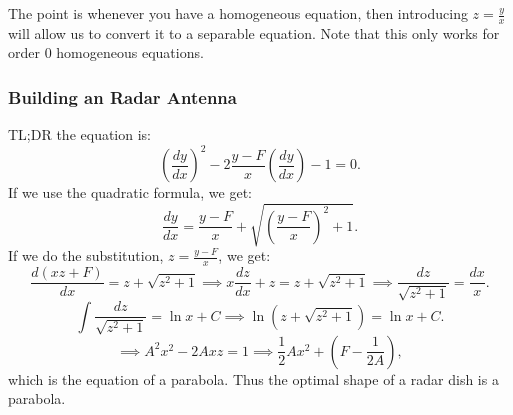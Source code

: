 \documentclass[../main/main.tex]{subfiles}
\begin{document}
\begin{remark}
	The point is whenever you have a homogeneous equation, then introducing $z=\frac{y}{x}$ will allow us to convert it to a separable equation. Note that this only works for order 0 homogeneous equations.
\end{remark}

\subsubsection{Building an Radar Antenna}
TL;DR the equation is: \[
	\left( \frac{dy}{dx} \right) ^2-2 \frac{y-F}{x} \left( \frac{dy}{dx} \right) -1 = 0
.\]  If we use the quadratic formula, we get: \[
\frac{dy}{dx} = \frac{y-F}{x}+\sqrt{\left( \frac{y-F}{x} \right) ^2+1} 
.\] If we do the substitution, $z=\frac{y-F}{x}$, we get: \[
\frac{d(xz+F)}{dx} = z+\sqrt{z^2+1} \implies x \frac{dz}{dx}+z = z + \sqrt{z^2+1}  \implies \frac{dz}{\sqrt{z^2+1} }=\frac{dx}{x}
.\] \[
\int \frac{dz}{\sqrt{z^2+1} }=\ln x+C \implies \ln\left( z+\sqrt{z^2+1}  \right) =\ln x +C
.\] \[
\implies A^2x^2-2Axz=1 \implies \frac{1}{2}Ax^2+\left( F-\frac{1}{2A} \right) 
,\]  which is the equation of a parabola. Thus the optimal shape of a radar dish is a parabola.
\end{document}
